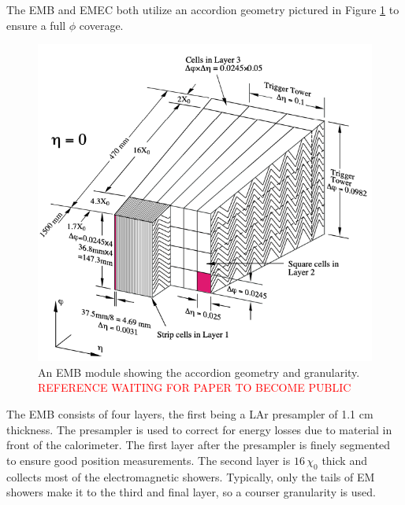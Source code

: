 			The \gls{EMB} and \gls{EMEC} both utilize an accordion geometry pictured in Figure \ref{fig:LAr-accordion} to ensure a full $\phi$ coverage. 
			\begin{figure}[!ht]
			\centering
			\includegraphics[width=.45\textwidth,keepaspectratio=true]{chapters/chapter3_experiment/images/LAr_Accordion_Geometry.png}
			\caption{An \gls{EMB} module showing the accordion geometry and granularity. \textcolor{red}{REFERENCE WAITING FOR PAPER TO BECOME PUBLIC}} %
			\label{fig:LAr-accordion}
			\end{figure}
			The \gls{EMB} consists of four layers, the first being a \gls{LAr} presampler of 1.1 cm thickness. The presampler is used to correct for energy losses due to material in front of the calorimeter. The first layer after the presampler is finely segmented to ensure good position measurements. The second layer is $16 \, \chi_0$ thick and collects most of the electromagnetic showers. Typically, only the tails of \gls{EM} showers make it to the third and final layer, so a courser granularity is used. 

